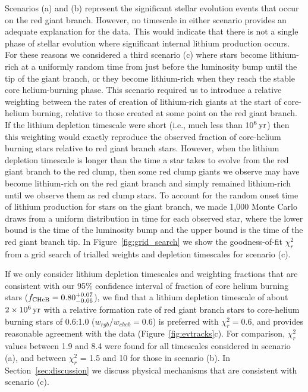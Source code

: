 \documentclass[twocolumn]{aastex62}
\begin{document}
Scenarios (a) and (b) represent the significant stellar evolution events that occur on the red giant branch. However, no timescale in either scenario provides an adequate explanation for the data. This would indicate that there is not a single phase of stellar evolution where significant internal lithium production occurs. For these reasons we considered a third scenario (c) where stars become lithium-rich at a uniformly random time from just before the luminosity bump until the tip of the giant branch, or they become
lithium-rich when they reach the stable core helium-burning phase. This scenario required us to introduce a relative weighting between the rates of creation of lithium-rich giants at the start of core-helium burning, relative to those created at some point on the red giant branch. If the lithium depletion timescale were short (i.e., much less than $10^6\,{\rm yr}$) then this weighting would exactly reproduce the observed fraction of core-helium burning stars relative to red giant branch stars. However, when the lithium depletion timescale is longer than the time a star takes to evolve from the red giant branch to the red clump, then some red clump giants we observe may have become lithium-rich on the red giant branch and simply remained lithium-rich until we observe them as red clump stars. To account for the random onset time of lithium production  for stars on the giant branch, we made 1,000 Monte Carlo draws from a uniform distribution in time for each observed star, where the lower bound is the time of the luminosity bump and the upper bound is the time of the red giant branch tip. In Figure~\ref{fig:grid_search} we show the goodness-of-fit $\chi_r^2$ from a grid search of trialled weights and depletion timescales for scenario (c). 

If we only consider lithium depletion timescales and weighting fractions that are consistent with our 95\% confidence interval of fraction of core helium burning stars ($f_{\rm CHeB} = 0.80^{+0.07}_{-0.06}$), we find that a lithium depletion timescale of about $2\times 10^{6}\,{\rm yr}$ with a relative formation rate of red giant branch stars to core-helium burning stars of 0.6:1.0 ($w_{rgb}/w_{cheb} = 0.6$) is preferred with $\chi_r^2 = 0.6$, and provides reasonable agreement with the data (Figure~\ref{fig:evtracks}c). For comparison, $\chi_r^2$ values between 1.9 and 8.4 were found for all timescales considered in scenario (a), and between $\chi_r^2$ = 1.5 and 10 for those in scenario (b).
In Section~\ref{sec:discussion} we discuss physical mechanisms that are consistent with scenario (c).
 
\end{document}
